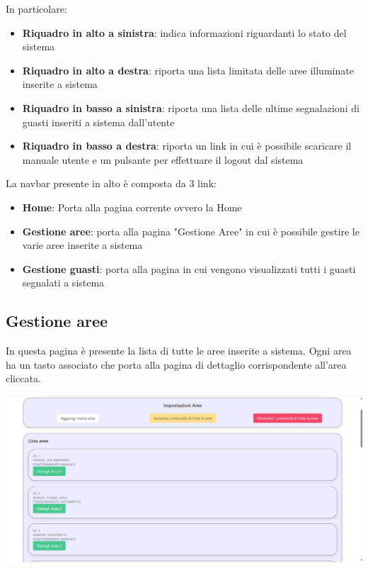 \documentclass[9pt]{article}
\begin{document}
In particolare:
\begin{itemize}
	\item \textbf{Riquadro in alto a sinistra}: indica informazioni riguardanti lo stato del sistema
	\item \textbf{Riquadro in alto a destra}: riporta una lista limitata delle aree illuminate inserite a sistema
	\item \textbf{Riquadro in basso a sinistra}: riporta una lista delle ultime segnalazioni di guasti inseriti a sistema dall'utente
	\item \textbf{Riquadro in basso a destra}: riporta un link in cui è possibile scaricare il manuale utente e un pulsante per effettuare il logout dal sistema\\
\end{itemize}

La navbar presente in alto è composta da 3 link:

\begin{itemize}
	\item \textbf{Home}: Porta alla pagina corrente ovvero la Home
	\item \textbf{Gestione aree}: porta alla pagina "Gestione Aree" in cui è possibile gestire le varie aree inserite a sistema
	\item \textbf{Gestione guasti}: porta alla pagina in cui vengono visualizzati tutti i guasti segnalati a sistema
\end{itemize}

\subsection{Gestione aree}
In questa pagina è presente la lista di tutte le aree inserite a sistema.
Ogni area ha un tasto associato che porta alla pagina di dettaglio corrispondente all'area cliccata.

\begin{center}
	\includegraphics[scale=0.3]{Gestione_aree.png}
\end{center}
\end{document}
